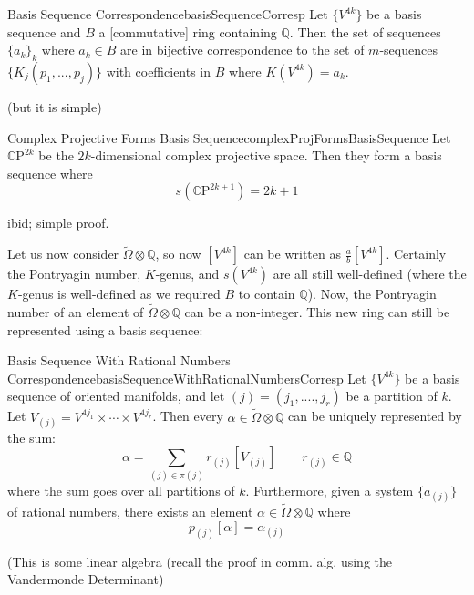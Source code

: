 \documentclass{book}
\newcommand{\Q}{{\mathbb{Q}}}
\newcommand{\CP}{\mathbb{C}\mathrm{P}}
\begin{document}
\begin{thm}{Basis Sequence Correspondence}{basisSequenceCorresp}
  Let $\{V^{4k}\}$ be a basis sequence and $B$ a [commutative] ring containing $\Q$. Then the set of sequences
  $\{a_k\}_k$ where $a_k \in B$ are in bijective correspondence to the set of $m$-sequences $\{K_j(p_1, ...,
  p_j)\}$ with coefficients in $B$ where $K(V^{4k}) = a_k$.
\end{thm}

\begin{Proof}
  \cite[p.79]{hirzebruchTopologicalMethodsAlgebraic1995} (but it is simple)
\end{Proof}

\begin{thm}{Complex Projective Forms Basis Sequence}{complexProjFormsBasisSequence}
  Let $\CP^{2k}$ be the $2k$-dimensional complex projective space. Then they form a basis sequence where
  \[
    s(\CP^{2k+1}) = 2k+1
  \]
\end{thm}

\begin{Proof}
  ibid; simple proof.
\end{Proof}

Let us now consider $\widetilde{\Omega}\otimes \Q$, so now $[V^{4k}]$ can be written as $\frac{a}{b}[V^{4k}]$.
Certainly the Pontryagin number, $K$-genus, and $s(V^{4k})$ are all still well-defined (where the $K$-genus is
well-defined as we required $B$ to contain $\Q$). Now, the Pontryagin number of an element of
$\widetilde{\Omega}\otimes \Q$ can be a non-integer. This new ring can still be represented using a basis
sequence:

\begin{thm}{Basis Sequence With Rational Numbers Correspondence}{basisSequenceWithRationalNumbersCorresp}
  Let $\{V^{4k}\}$ be a basis sequence of oriented manifolds, and let $(j) = (j_1, ...., j_r)$ be a partition
  of $k$. Let $V_{(j)} = V^{4j_1}\times \cdots \times V^{4j_r}$. Then every $\alpha \in
  \widetilde{\Omega}\otimes \Q$ can be uniquely represented by the sum:
  \[
    \alpha = \sum_{(j) \in \pi(j)} r_{(j)}[V_{(j)}] \qquad r_{(j)} \in \Q
  \]
  where the sum goes over all partitions of $k$. Furthermore, given a system $\{a_{(j)}\}$ of rational
  numbers, there exists an element $\alpha \in \widetilde{\Omega}\otimes \Q$ where
  \[
    p_{(j)}[\alpha] = \alpha_{(j)}
  \]
\end{thm}

\begin{Proof}
  \cite[p.80]{hirzebruchTopologicalMethodsAlgebraic1995} (This is some linear algebra (recall the proof in comm. alg. using the Vandermonde Determinant)
\end{Proof}
\end{document}
